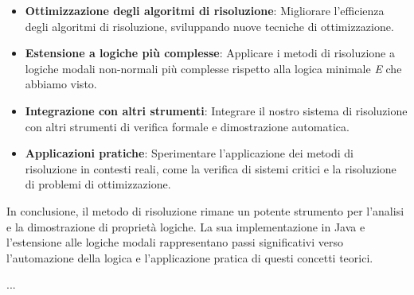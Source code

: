 \documentclass[a4paper,12pt]{report}
\begin{document}
\begin{itemize}
    \item \textbf{Ottimizzazione degli algoritmi di risoluzione}: Migliorare l'efficienza degli algoritmi di risoluzione, sviluppando nuove tecniche di ottimizzazione.
    \item \textbf{Estensione a logiche più complesse}: Applicare i metodi di risoluzione a logiche modali non-normali più complesse rispetto alla logica minimale \emph{E} che abbiamo visto.
    \item \textbf{Integrazione con altri strumenti}: Integrare il nostro sistema di risoluzione con altri strumenti di verifica formale e dimostrazione automatica.
    \item \textbf{Applicazioni pratiche}: Sperimentare l'applicazione dei metodi di risoluzione in contesti reali, come la verifica di sistemi critici e la risoluzione di problemi di ottimizzazione.
\end{itemize}
In conclusione, il metodo di risoluzione rimane un potente strumento per l'analisi e la dimostrazione di proprietà logiche. La sua implementazione in Java e l'estensione alle logiche modali rappresentano passi significativi verso l'automazione della logica e l'applicazione pratica di questi concetti teorici.


%
%




%
%
...
\end{document}
